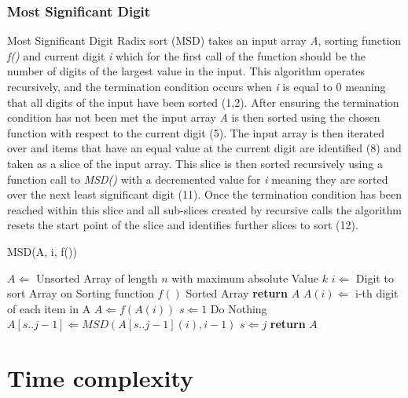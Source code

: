 \documentclass[12pt]{article}
\begin{document}
	\subsubsection{Most Significant Digit}
	Most Significant Digit Radix sort (MSD) takes an input array \textit{A}, sorting function \textit{f()} and current digit \textit{i} which for the first call of the function should be the number of digits of the largest value in the input. This algorithm operates recursively, and the termination condition occurs when \textit{i} is equal to 0 meaning that all digits of the input have been sorted (1,2). After ensuring the termination condition has not been met the input array \textit{A} is then sorted using the chosen function with respect to the current digit (5). The input array is then iterated over and items that have an equal value at the current digit are identified (8) and taken as a slice of the input array. This slice is then sorted recursively using a function call to \textit{MSD()} with a decremented value for \textit{i}  meaning they are sorted over the next least significant digit (11). Once the termination condition has been reached within this slice and all sub-slices created by recursive calls the algorithm resets the start point of the slice and identifies further slices to sort (12).
	\begin{algorithm} %
		\caption{MSD({A, i, f()})} %
		\label{alg4} %
		\begin{algorithmic}[1] %
			\REQUIRE $A \Leftarrow$ Unsorted Array of length $n$ with maximum absolute Value $k$
			\REQUIRE $i \Leftarrow$ Digit to sort Array on 
			\REQUIRE Sorting function $f()$
			\ENSURE Sorted Array
				\STATE \textbf{return} $A$
			\ENDIF
			\STATE $A(i) \Leftarrow$ i-th digit of each item in A
			\STATE $A \Leftarrow f(A(i))$ 
			\STATE $s \Leftarrow 1$ 
					\STATE Do Nothing
				\ELSE
					\STATE $A[s..j-1] \Leftarrow MSD(A[s..j-1](i), i-1)$
					\STATE $s \Leftarrow j$ 
				\ENDIF
			\ENDFOR
			\STATE \textbf{return} $A$
		\end{algorithmic}
	\end{algorithm}
	\pagebreak
	\section{Time complexity}
\end{document}
